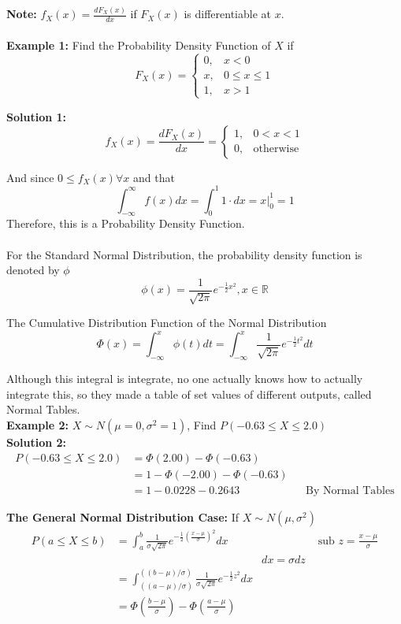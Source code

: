 \documentclass[12pt, twoside]{article}
\begin{document}
\textbf{Note:} $f_X (x) = \frac{dF_X (x)}{dx}$ if $F_X (x)$ is differentiable at $x$.\\
\\
\textbf{Example 1:} Find the Probability Density Function of $X$ if $$F_X (x) = \begin{cases}
0, & x < 0\\
x, & 0 \leq x \leq 1\\
1, & x > 1
\end{cases}
$$

\textbf{Solution 1:} $$f_X (x) = \frac{dF_X (x)}{dx} = \begin{cases}
1, & 0 < x < 1\\
0, & \text{otherwise}
\end{cases}
$$

And since $0 \leq f_X (x) \forall x$ and that $$\int^\infty_{-\infty} f(x) dx = \int^1_{0} 1 \cdot dx = x\rvert^1_0 = 1$$
Therefore, this is a Probability Density Function.\\
\\
For the Standard Normal Distribution, the probability density function is denoted by $\phi$
$$\phi (x) = \frac{1}{\sqrt{2\pi}}e^{-\frac{1}{2}x^2}, x \in\mathbb{R}$$

The Cumulative Distribution Function of the Normal Distribution
$$\Phi (x) = \int^x_{-\infty} \phi (t) dt = \int^x_{-\infty} \frac{1}{\sqrt{2\pi}}e^{-\frac{1}{2}t^2} dt$$

Although this integral is integrate, no one actually knows how to actually integrate this, so they made a table of set values of different outputs, called Normal Tables.\\

\textbf{Example 2:} $X\sim N(\mu = 0,\sigma^2 = 1)$, Find $P(-0.63 \leq X \leq 2.0)$\\

\textbf{Solution 2:}
\begin{align*}
	P(-0.63 \leq X \leq 2.0) &= \Phi (2.00) - \Phi (-0.63)\\
	&= 1 - \Phi (-2.00) - \Phi (-0.63)\\
	&= 1 - 0.0228 - 0.2643 && \text{By Normal Tables}
\end{align*}

\textbf{The General Normal Distribution Case:} If $X\sim N(\mu,\sigma^2)$
\begin{align*}
	P(a \leq X \leq b) &= \int^b_a \frac{1}{\sigma\sqrt{2\pi}}e^{-\frac{1}{2}(\frac{x - \mu}{\sigma})^2} dx &&\text{ sub } z = \frac{x-\mu}{\sigma}\\
	&& dx = \sigma dz\\
	&= \int^{((b-\mu)/\sigma)}_{((a-\mu)/\sigma)} \frac{1}{\sigma\sqrt{2\pi}}e^{-\frac{1}{2}z^2} dx\\
	&= \Phi (\frac{b - \mu}{\sigma}) - \Phi (\frac{a - \mu}{\sigma})
\end{align*}
\end{document}
